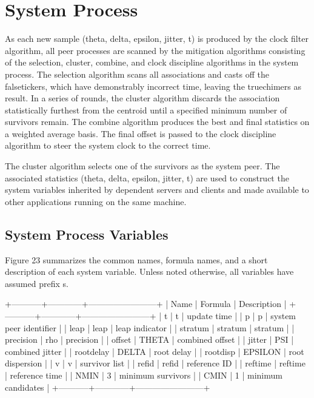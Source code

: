 \chapter{System Process}

As each new sample (theta, delta, epsilon, jitter, t) is produced by
the clock filter algorithm, all peer processes are scanned by the
mitigation algorithms consisting of the selection, cluster, combine,
and clock discipline algorithms in the system process.  The selection
algorithm scans all associations and casts off the falsetickers,
which have demonstrably incorrect time, leaving the truechimers as
result.  In a series of rounds, the cluster algorithm discards the
association statistically furthest from the centroid until a
specified minimum number of survivors remain.  The combine algorithm
produces the best and final statistics on a weighted average basis.
The final offset is passed to the clock discipline algorithm to steer
the system clock to the correct time.

The cluster algorithm selects one of the survivors as the system
peer.  The associated statistics (theta, delta, epsilon, jitter, t)
are used to construct the system variables inherited by dependent
servers and clients and made available to other applications running
on the same machine.

\section{System Process Variables}

Figure 23 summarizes the common names, formula names, and a short
description of each system variable.  Unless noted otherwise, all
variables have assumed prefix s.

            +-----------+------------+------------------------+
            | Name      | Formula    | Description            |
            +-----------+------------+------------------------+
            | t         | t          | update time            |
            | p         | p          | system peer identifier |
            | leap      | leap       | leap indicator         |
            | stratum   | stratum    | stratum                |
            | precision | rho        | precision              |
            | offset    | THETA      | combined offset        |
            | jitter    | PSI        | combined jitter        |
            | rootdelay | DELTA      | root delay             |
            | rootdisp  | EPSILON    | root dispersion        |
            | v         | v          | survivor list          |
            | refid     | refid      | reference ID           |
            | reftime   | reftime    | reference time         |
            | NMIN      | 3          | minimum survivors      |
            | CMIN      | 1          | minimum candidates     |
            +-----------+------------+------------------------+

